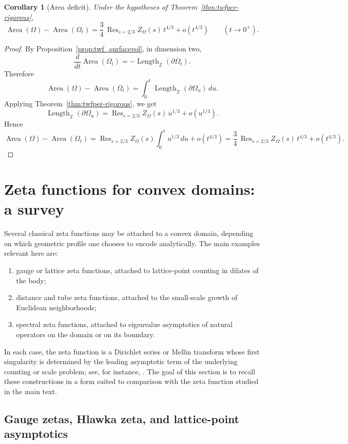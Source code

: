 \documentclass[a4paper,american,11pt]{amsart}
\theoremstyle{plain}
\newtheorem{corollary}[theorem]{Corollary}
\theoremstyle{definition}
\newcommand{\Z}{\mathbb Z}
\DeclareMathOperator*{\Res}{Res}
\DeclareMathOperator{\Area}{Area}
\DeclareMathOperator{\Length}{Length}
\begin{document}
\begin{corollary}[Area deficit]
\label{cor:area-deficit-rigorous}
Under the hypotheses of Theorem~\ref{thm:twfper-rigorous},
\[
\Area(\Omega)-\Area(\Omega_t)
=
\frac34\,\Res_{s=2/3}Z_\Omega(s)\,t^{4/3}+o(t^{4/3})
\qquad (t\to0^+).
\]
\end{corollary}

\begin{proof}
By Proposition~\ref{prop:twf_surfacevol}, in dimension two,
\[
\frac{d}{dt}\Area(\Omega_t)
=
-\Length_{\Z}(\partial\Omega_t).
\]
Therefore
\[
\Area(\Omega)-\Area(\Omega_t)
=
\int_0^t \Length_{\Z}(\partial\Omega_u)\,du.
\]
Applying Theorem~\ref{thm:twfper-rigorous}, we get
\[
\Length_{\Z}(\partial\Omega_u)
=
\Res_{s=2/3}Z_\Omega(s)\,u^{1/3}+o(u^{1/3}).
\]
Hence
\[
\Area(\Omega)-\Area(\Omega_t)
=
\Res_{s=2/3}Z_\Omega(s)
\int_0^t u^{1/3}\,du
+
o(t^{4/3})
=
\frac34\,\Res_{s=2/3}Z_\Omega(s)\,t^{4/3}
+
o(t^{4/3}).
\]
\end{proof}

\section{Zeta functions for convex domains: a survey}\label{sec_survey}

Several classical zeta functions may be attached to a convex domain, depending on which geometric profile one chooses to encode analytically. The main examples relevant here are:

\begin{enumerate}
\item gauge or lattice zeta functions, attached to lattice-point counting in dilates of the body;
\item distance and tube zeta functions, attached to the small-scale growth of Euclidean neighborhoods;
\item spectral zeta functions, attached to eigenvalue asymptotics of natural operators on the domain or on its boundary.
\end{enumerate}

In each case, the zeta function is a Dirichlet series or Mellin transform whose first singularity is determined by the leading asymptotic term of the underlying counting or scale problem; see, for instance, \cite{Montoro2018,LapidusRadunovicZubrinic2017,Seeley1967}. The goal of this section is to recall these constructions in a form suited to comparison with the zeta function studied in the main text.

\subsection{Gauge zetas, Hlawka zeta, and lattice-point asymptotics}
\end{document}
